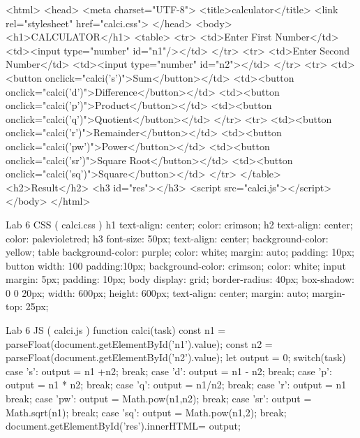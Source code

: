 <html> 
<head> 
<meta charset="UTF-8"> 
<title>calculator</title> 
<link rel="stylesheet" href="calci.css"> 
</head> 
<body> 
<h1>CALCULATOR</h1> 
<table> 
<tr> 
<td>Enter First Number</td> 
<td><input type="number" id="n1"/></td> 
</tr> 
<tr> 
<td>Enter Second Number</td> 
<td><input type="number" id="n2"></td> 
</tr> 
<tr> 
<td><button onclick="calci('s')">Sum</button></td> 
<td><button onclick="calci('d')">Difference</button></td> 
<td><button onclick="calci('p')">Product</button></td> 
<td><button onclick="calci('q')">Quotient</button></td> 
</tr> 
<tr> 
<td><button onclick="calci('r')">Remainder</button></td> 
<td><button onclick="calci('pw')">Power</button></td> 
<td><button onclick="calci('sr')">Square Root</button></td> 
<td><button onclick="calci('sq')">Square</button></td> 
</tr>    
</table> 
<h2>Result</h2> 
<h3 id="res"></h3> 
<script src="calci.js"></script> 
</body> 
</html> 

Lab 6  CSS ( calci.css ) 
h1 
{ 
} 
text-align: center; 
color: crimson; 
h2 
{ 
} 
text-align: center; 
color: palevioletred; 
h3 
{ 
font-size: 50px; 
text-align: center; 
background-color: yellow; 
} 
table 
{ 
} 
background-color: purple; 
color: white; 
margin: auto; 
padding: 10px; 
button 
{ 
} 
width: 100%
padding:10px; 
background-color: crimson; 
color: white; 
input 
{ 
} 
margin: 5px; 
padding: 10px; 
body 
{ 
} 
display: grid; 
border-radius: 40px; 
box-shadow: 0 0 20px; 
width: 600px; 
height: 600px; 
text-align: center; 
margin: auto; 
margin-top: 25px; 

Lab 6 JS ( calci.js ) 
function calci(task) 
{ 
const n1 = parseFloat(document.getElementById('n1').value); 
const n2 = parseFloat(document.getElementById('n2').value); 
let output = 0; 
switch(task) 
{ 
case 's':  output = n1 +n2; 
break; 
case 'd':  output = n1 - n2; 
break; 
case 'p':  output = n1 * n2; 
break; 
case 'q':  output = n1/n2; 
break; 
case 'r':  output = n1 %
break; 
case 'pw':  output = Math.pow(n1,n2); 
break; 
case 'sr':  output = Math.sqrt(n1); 
break; 
case 'sq':  output = Math.pow(n1,2); 
break; 
} 
document.getElementById('res').innerHTML= output; 
}

